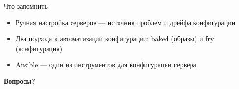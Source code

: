 \documentclass[aspectratio=169]{beamer}
\begin{document}
    \begin{frame}{Что запомнить}
        \begin{itemize}
            \item Ручная настройка серверов — источник проблем и дрейфа конфигурации
            \item Два подхода к автоматизации конфигурации: baked (образы) и fry (конфигурация)
            \item Ansible — один из инструментов для конфигурации сервера
        \end{itemize}

        \vspace{0.5cm}

        \begin{center}
            \textbf{Вопросы?}
        \end{center}
    \end{frame}
\end{document}
